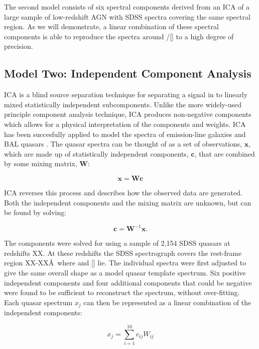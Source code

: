 The second model consists of six spectral components derived from an ICA of a large sample of low-redshift AGN with SDSS spectra covering the same spectral region.
As we will demonstrate, a linear combination of these spectral components is able to reproduce the spectra around \hbns/[] to a high degree of precision.  

\subsection{Model Two: Independent Component Analysis}

ICA is a blind source separation technique for separating a signal in to linearly mixed statistically independent subcomponents. 
Unlike the more widely-used principle component analysis technique, ICA produces non-negative components which allows for a physical interpretation of the components and weights.  
ICA has been succesfully applied to model the spectra of emission-line galaxies \citep{allen13} and BAL quasars \citep{allen11}. 
The quasar spectra can be thought of as a set of observations, $\bm{x}$, which are made up of statistically independent components, $\bm{c}$, that are combined by some mixing matrix, $\bm{W}$:

\begin{equation}
    \bm{x} = \bm{W}\bm{c}
\end{equation}

ICA reverses this process and describes how the observed data are generated. 
Both the independent components and the mixing matrix are unknown, but can be found by solving:

\begin{equation}
    \bm{c} = \bm{W}^{-1}\bm{x}.
\end{equation}

The components were solved for using a sample of 2,154 SDSS quasars at redshifts XX. 
At these redshifts the SDSS spectrograph covers the rest-frame region XX-XX\AA\, where \hb and [] lie. 
The individual spectra were first adjusted to give the same overall shape as a model quasar template spectrum.
Six positive independent components and four additional components that could be negative were found to be sufficient to reconstruct the spectrum, without over-fitting. 
Each quasar spectrum $x_j$ can then be represented as a linear combination of the independent components: 

\begin{equation}
    x_j = \sum_{i=1}^{10} c_{ij}W_{ij}
\end{equation}

